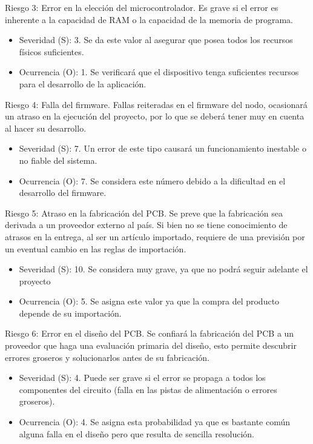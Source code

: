 \documentclass[11pt]{charter}
\begin{document}
Riesgo 3: Error en la elección del microcontrolador. Es grave si el error es inherente a la capacidad de RAM o la capacidad de la memoria de programa.
\begin{itemize}
\item Severidad (S): 3. Se da este valor al asegurar que posea todos los recursos físicos suficientes.
\item Ocurrencia (O): 1. Se verificará que el dispositivo tenga suficientes recursos para el desarrollo de la aplicación.
\end{itemize}

Riesgo 4: Falla del firmware. Fallas reiteradas en el firmware del nodo, ocasionará un atraso en la ejecución del proyecto, por lo que se deberá tener muy en cuenta al hacer su desarrollo. 
\begin{itemize}
\item Severidad (S): 7. Un error de este tipo causará un funcionamiento inestable o no fiable del sistema.
\item Ocurrencia (O): 7. Se considera este número debido a la dificultad en el desarrollo del firmware.
\end{itemize}

Riesgo 5: Atraso en la fabricación del PCB. Se preve que la fabricación sea derivada a un proveedor externo al país. Si bien no se tiene conocimiento de atrasos en la entrega, al ser un artículo importado, requiere de una previsión por un eventual cambio en las reglas de importación.
\begin{itemize}
\item Severidad (S): 10. Se considera muy grave, ya que no podrá seguir adelante el proyecto
\item Ocurrencia (O): 5. Se asigna este valor ya que la compra del producto depende de su importación.
\end{itemize}

Riesgo 6: Error en el diseño del PCB. Se confiará la fabricación del PCB a un proveedor que haga una evaluación primaria del diseño, esto permite descubrir errores groseros y solucionarlos antes de su fabricación.
\begin{itemize}
\item Severidad (S): 4. Puede ser grave si el error se propaga a todos los componentes del circuito (falla en las pistas de alimentación o errores groseros).
\item Ocurrencia (O): 4. Se asigna esta probabilidad ya que es bastante común alguna falla en el diseño pero que resulta de sencilla resolución.
\end{itemize}
\end{document}
